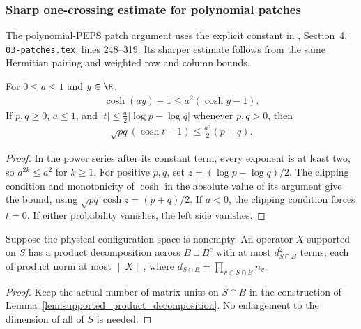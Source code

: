 \subsubsection{Sharp one-crossing estimate for polynomial patches}

The polynomial-PEPS patch argument uses the explicit constant in
\cite{OpenAI2026PolynomialPEPS}, Section~4,
\texttt{03-patches.tex}, lines 248--319. Its sharper estimate follows
from the same Hermitian pairing and weighted row and column bounds.

\begin{theorem}
    \label{lem:patch_cosh_scaling}
    \leanok
    For $0\le a\le1$ and $y\in\R$,
    \begin{align*}
        \cosh(ay)-1\le a^2(\cosh y-1).
    \end{align*}
    If $p,q\ge0$, $a\le1$, and
    $|t|\le\frac a2|\log p-\log q|$ whenever $p,q>0$, then
    \begin{align*}
        \sqrt{pq}(\cosh t-1)\le\frac{a^2}{2}(p+q).
    \end{align*}
\end{theorem}
\begin{proof}\leanok
    In the power series after its constant term, every exponent is at
    least two, so $a^{2k}\le a^2$ for $k\ge1$. For positive $p,q$, set
    $z=(\log p-\log q)/2$. The clipping condition and monotonicity of
    $\cosh$ in the absolute value of its argument give the bound, using
    $\sqrt{pq}\cosh z=(p+q)/2$. If $a<0$, the clipping condition forces
    $t=0$. If either probability vanishes, the left side vanishes.
\end{proof}

\begin{theorem}
    \label{lem:patch_inside_decomposition}
    \leanok
    Suppose the physical configuration space is nonempty. An operator
    $X$ supported on $S$ has a product decomposition across $B\sqcup B^c$
    with at most $d_{S\cap B}^2$ terms, each of product norm at most
    $\lVert X\rVert$, where $d_{S\cap B}=\prod_{v\in S\cap B}n_v$.
\end{theorem}
\begin{proof}\leanok
    Keep the actual number of matrix units on $S\cap B$ in the
    construction of Lemma~\ref{lem:supported_product_decomposition}.
    No enlargement to the dimension of all of $S$ is needed.
\end{proof}

